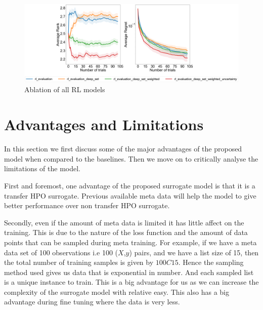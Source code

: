\documentclass[12pt, twoside, ngerman]{report}
\begin{document}
\begin{figure}[h]
  \centering
    \includegraphics[scale=0.20]{images/FinalAblation}
    \caption{Ablation of all RL models}
    \label{fig:FinalAblation}
\end{figure}

\section{Advantages and Limitations}
\label{sec:advantagesAndLimitations}

In this section we first discuss some of the major advantages of the proposed model when compared to the baselines.
Then we move on to critically analyse the limitations of the model.

First and foremost,  one advantage of the proposed surrogate model is that it is a transfer HPO surrogate.  Previous available meta data will help the model to give better performance over non transfer HPO surrogate.

Secondly,  even if the amount of meta data is limited it has little affect on the training.
This is due to the nature of the loss function and the amount of data points that can be sampled during meta training.
For example,  if we have a meta data set of 100 observations i.e 100 ($X$,$y$) pairs,  and we have a list size of 15,  then the total number of training samples is given by $100C15$.
Hence the sampling method used gives us data that is exponential in number.
And each sampled list is a unique instance to train.
This is a big advantage for us as we can increase the complexity of the surrogate model with relative easy.
This also has a big advantage during fine tuning where the data is very less.
\end{document}
